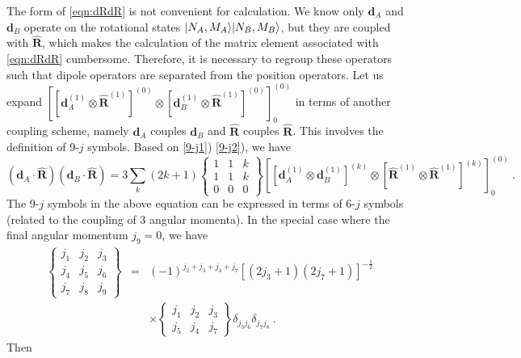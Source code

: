 The form of \autoref{eqn:dRdR} is not convenient for calculation. We know only $\mathbf{d}_A$ and $\mathbf{d}_B$ 
operate on the rotational states $| N_A, M_A \rangle | N_B, M_B \rangle$, but they are coupled with $\mathbf{\hat{R}}$, which makes the calculation of the matrix element associated with \autoref{eqn:dRdR} cumbersome. Therefore, it is necessary to regroup these operators such that dipole operators are separated from the position operators. 
Let us expand $\left[ \left[ \mathbf{d}_{A}^{(1)} \otimes \mathbf{\hat{R}}^{(1)} \right]^{(0)}\otimes \left[ \mathbf{d}_{B}^{(1)} \otimes \mathbf{\hat{R}}^{(1)} \right]^{(0)}  \right]_{0}^{(0)}$ in terms of another coupling scheme, namely $\mathbf{d}_{A}$ couples $\mathbf{d}_{B}$ and $\mathbf{\hat{R}}$ couples $\mathbf{\hat{R}}$. 
This involves the definition of 9-$j$ symbols. Based on \autoref{9-j1}) \autoref{9-j2}), we have
\begin{equation}
(\mathbf{d}_{A}\cdot\mathbf{\hat{R}})(\mathbf{d}_{B}\cdot\mathbf{\hat{R} })= 3\sum_{k}(2k + 1) 
\left\{
\begin{array}{ccc}
1& 1&k \\
1&1&k \\
0&0&0 
\end{array}
\right\} 
\left[ \left[ \mathbf{d}_{A}^{(1)} \otimes \mathbf{d}_{B}^{(1)} \right]^{(k)}\otimes \left[ \mathbf{\hat{R}}^{(1)} \otimes \mathbf{\hat{R}}^{(1)} \right]^{(k)}  \right]_{0}^{(0)} \ . \label{regrouping}
\end{equation}
The 9-$j$ symbols in the above equation can be expressed in terms of 6-$j$ symbols (related to the coupling of 3 angular momenta). In the special case where the final angular momentum $j_{9}=0$, we have
\begin{eqnarray}
\left\{
\begin{array}{ccc}
j_{1}& j_{2}&j_{3} \\
j_{4}&j_{5}&j_{6} \\
j_{7}&j_{8}&j_{9}
\end{array}
\right\} 
&=&(-1)^{j_{2} + j_{3} + j_{4} + j_{7}}[(2j_{3} +1)(2j_{7} + 1)]^{-\frac{1}{2}} \nonumber \\
&  & \times 
\left\{
\begin{array}{ccc}
j_{1}& j_{2}&j_{3} \\
j_{5}&j_{4}&j_{7} 
\end{array}
\right\} 
\delta_{j_{3}j_{6}}\delta_{j_{7}j_{8}} \ . 
\end{eqnarray}
Then
